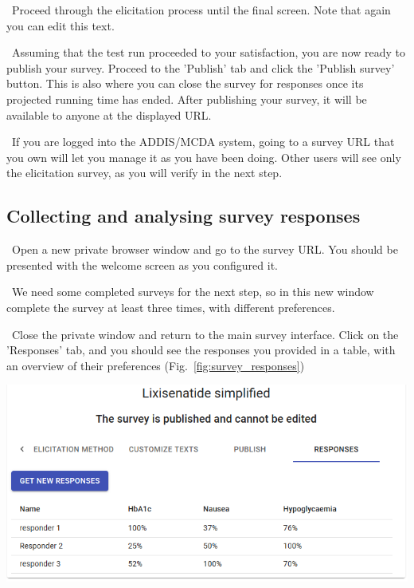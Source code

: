 \documentclass[00_mcda_tutorial.tex]{subfiles}
\begin{document}
\begin{sidebar*}
\noindent \leftpointright \, Proceed through the elicitation process until the final screen. Note that again you can edit this text.
\newline

\noindent \leftpointright \, Assuming that the test run proceeded to your satisfaction, you are now ready to publish your survey. Proceed to the 'Publish' tab and click the 'Publish survey' button. This is also where you can close the survey for responses once its projected running time has ended. After publishing your survey, it will be available to anyone at the displayed URL.
\newline

\noindent \faLightbulbO \, If you are logged into the ADDIS/MCDA system, going to a survey URL that you own will let you manage it as you have been doing. Other users will see only the elicitation survey, as you will verify in the next step.
\newline

\subsection*{Collecting and analysing survey responses}

\noindent \leftpointright \, Open a new private browser window and go to the survey URL. You should be presented with the welcome screen as you configured it.
\newline

\noindent \leftpointright \, We need some completed surveys for the next step, so in this new window complete the survey at least three times, with different preferences.
\newline

\noindent \leftpointright \, Close the private window and return to the main survey interface. Click on the 'Responses' tab, and you should see the responses you provided in a table, with an overview of their preferences  (Fig.~\ref{fig:survey_responses})
\newline

{	
	\centering
	\includegraphics[width=\textwidth]{fig/surveyResponses.png}
	\label{fig:survey_responses}
	\par
}



\end{sidebar*}
\end{document}
